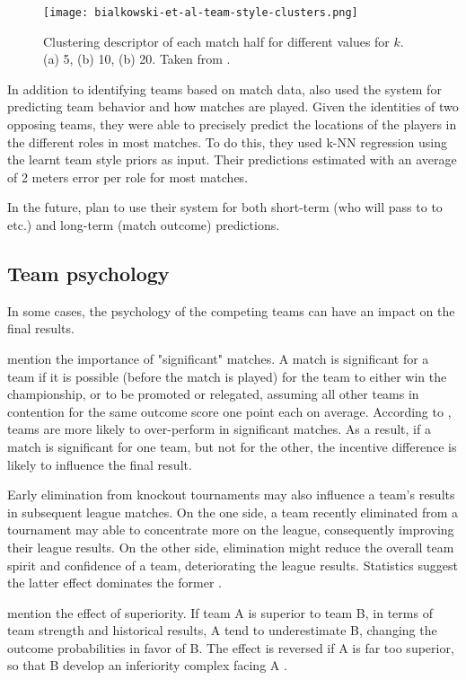 \begin{figure}
    \centering
    \texttt{[image: bialkowski-et-al-team-style-clusters.png]}
    \caption{Clustering descriptor of each match half for different values for $k$. (a) 5, (b) 10, (b) 20. Taken from \citet{bib:bialkowski-lucey-carr-yue-sridharan-matthews-2014}.}
    \label{fig:bialkowski-et-al-team-style-clusters}
\end{figure}

In addition to identifying teams based on match data, \citet{bib:bialkowski-lucey-carr-yue-sridharan-matthews-2014} also used the system for predicting team behavior and how matches are played. Given the identities of two opposing teams, they were able to precisely predict the locations of the players in the different roles in most matches. To do this, they used k-NN regression using the learnt team style priors as input. Their predictions estimated with an average of 2 meters error per role for most matches.

In the future, \citet{bib:bialkowski-lucey-carr-yue-sridharan-matthews-2014} plan to use their system for both short-term (who will pass to to etc.) and long-term (match outcome) predictions.


\subsection{Team psychology}

In some cases, the psychology of the competing teams can have an impact on the final results.

\citet{bib:goddard-asimakopoulos-2004} mention the importance of "significant" matches. A match is significant for a team if it is possible (before the match is played) for the team to either win the championship, or to be promoted or relegated, assuming all other teams in contention for the same outcome score one point each on average. According to \citet{bib:goddard-asimakopoulos-2004}, teams are more likely to over-perform in significant matches. As a result, if a match is significant for one team, but not for the other, the incentive difference is likely to influence the final result.

Early elimination from knockout tournaments may also influence a team's results in subsequent league matches. On the one side, a team recently eliminated from a tournament may able to concentrate more on the league, consequently improving their league results. On the other side, elimination might reduce the overall team spirit and confidence of a team, deteriorating the league results. Statistics suggest the latter effect dominates the former \citep{bib:goddard-asimakopoulos-2004}.

\citet{bib:rue-salvesen-2000} mention the effect of superiority. If team A is superior to team B, in terms of team strength and historical results, A tend to underestimate B, changing the outcome probabilities in favor of B. The effect is reversed if A is far too superior, so that B develop an inferiority complex facing A \citep{bib:rue-salvesen-2000}.